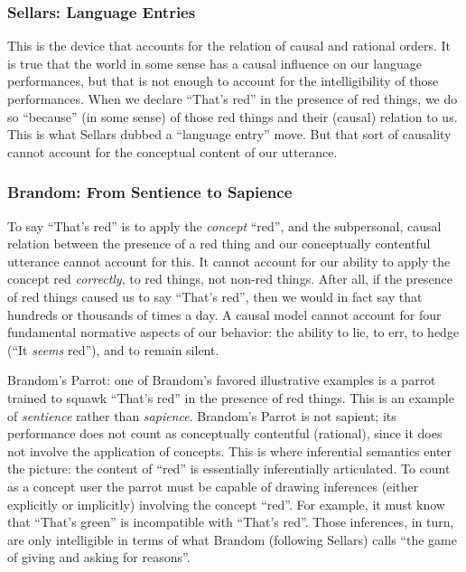 \documentclass[11pt,twoside]{article}
\begin{document}
\subsubsection{Sellars: Language Entries}

This is the device that accounts for the relation of causal and
rational orders.  It is true that the world in some sense has a causal
influence on our language performances, but that is not enough to
account for the intelligibility of those performances.  When we
declare ``That's red'' in the presence of red things, we do so
``because'' (in some sense) of those red things and their (causal)
relation to us.  This is what Sellars dubbed a ``language entry''
move.  But that sort of causality cannot account for the conceptual
content of our utterance.

\subsubsection{Brandom: From Sentience to Sapience}

To say ``That's red'' is to apply the \textit{concept} ``red'', and
the subpersonal, causal relation between the presence of a red thing
and our conceptually contentful utterance cannot account for this.  It
cannot account for our ability to apply the concept red
\textit{correctly}, to red things, not non-red things.  After all, if
the presence of red things caused us to say ``That's red'', then we
would in fact say that hundreds or thousands of times a day.  A causal
model cannot account for four fundamental normative aspects of our
behavior: the ability to lie, to err, to hedge (``It \textit{seems}
red''), and to remain silent.

Brandom's Parrot: one of Brandom's favored illustrative examples is a
parrot trained to squawk ``That's red'' in the presence of red things.
This is an example of \textit{sentience} rather than
\textit{sapience}.  Brandom's Parrot is not sapient; its performance
does not count as conceptually contentful (rational), since it does
not involve the application of concepts.  This is where inferential
semantics enter the picture: the content of ``red'' is essentially
inferentially articulated.  To count as a concept user the parrot must
be capable of drawing inferences (either explicitly or implicitly)
involving the concept ``red''.  For example, it must know that
``That's green'' is incompatible with ``That's red''.  Those
inferences, in turn, are only intelligible in terms of what Brandom
(following Sellars) calls ``the game of giving and asking for
reasons''.
\end{document}
